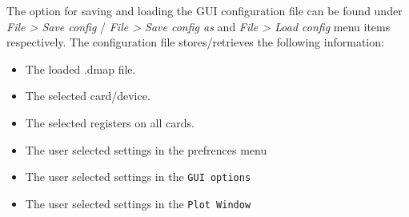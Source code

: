 The option for saving and loading the GUI configuration file can be found under \textit{File > Save config} / \textit{File > Save config as} and \textit{File > Load config }menu items respectively. The configuration file stores/retrieves the following information:

\begin{itemize}
\item The loaded .dmap file.
\item The selected card/device.
\item The selected registers on all cards.
\item The user selected settings in the prefrences menu
\item The user selected settings in the \texttt{GUI options}
\item The user selected settings in the \texttt{Plot Window}
\end{itemize}



%
%


%
%
%
%
%




